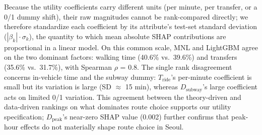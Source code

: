 Because the utility coefficients carry different units (per minute, per
transfer, or a 0/1 dummy shift), their raw magnitudes cannot be rank-compared
directly; we therefore standardize each coefficient by its attribute's
test-set standard deviation ($|\beta_k|\cdot\sigma_k$), the quantity to which
mean absolute SHAP contributions are proportional in a linear model. On this
common scale, MNL and LightGBM agree on the two dominant factors: walking
time (40.6\% vs.\ 39.6\%) and transfers (35.6\% vs.\ 31.7\%), with Spearman
$\rho$ = 0.8. The single rank disagreement concerns in-vehicle time and the
subway dummy: $T_{\mathrm{ride}}$'s per-minute coefficient is small but its
variation is large (SD $\approx$ 15 min), whereas $D_{\mathrm{subway}}$'s
large coefficient acts on limited 0/1 variation. This agreement between the
theory-driven and data-driven rankings on what dominates route choice
supports our utility specification; $D_{\mathrm{peak}}$'s near-zero SHAP
value (0.002) further confirms that peak-hour effects do not materially shape
route choice in Seoul.
